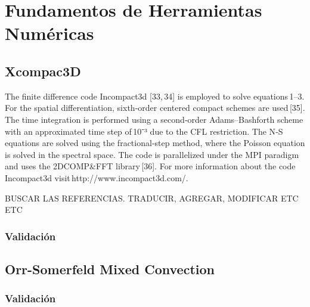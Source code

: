 \chapter{Fundamentos de Herramientas Numéricas}






\newpage

\section{Xcompac3D}

The finite difference code Incompact3d [33, 34] is employed to solve equations 1–3. For the spatial differentiation, sixth‑order centered compact schemes are used [35]. The time integration is performed using a second‑order Adams–Bashforth scheme with an approximated time step of 10⁻³ due to the CFL restriction. The N‑S equations are solved using the fractional‑step method, where the Poisson equation is solved in the spectral space. The code is parallelized under the MPI paradigm and uses the 2DCOMP&FFT library [36]. For more information about the code Incompact3d visit http://www.incompact3d.com/.

BUSCAR LAS REFERENCIAS. TRADUCIR, AGREGAR, MODIFICAR ETC ETC

\subsection{Validación}

\section{Orr-Somerfeld Mixed Convection}

\subsection{Validación}




